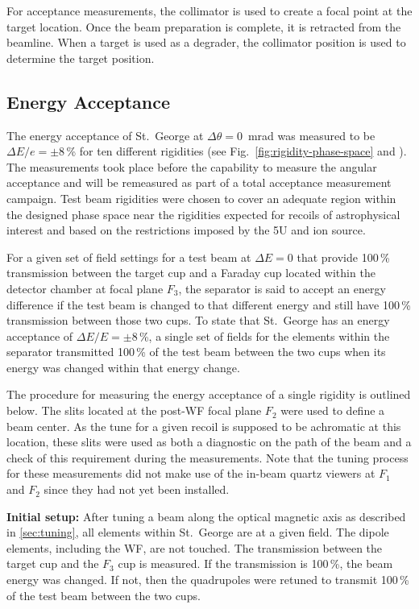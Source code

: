 For acceptance measurements, the collimator is used to create a focal point at
the target location. Once the beam preparation is complete, it is retracted
from the beamline. When a target is used as a degrader, the collimator position
is used to determine the target position.


\subsection{Energy Acceptance}

The energy acceptance of St.\ George at $\Delta\theta = 0$~mrad was measured to
be $\Delta E/e = \pm 8$\,\% for ten different rigidities (see
Fig.~\ref{fig:rigidity-phase-space} and \cite{Meisel2017}). The measurements
took place before the capability to measure the angular acceptance and will
be remeasured as part of a total acceptance measurement campaign. Test beam
rigidities were chosen to cover an adequate region within the designed phase
space near the rigidities expected for recoils of astrophysical interest and
based on the restrictions imposed by the 5U and ion source.

For a given set of field settings for a test beam at $\Delta E = 0$ that
provide 100\,\% transmission between the target cup and a Faraday cup located
within the detector chamber at focal plane $F_3$, the separator is said to
accept an energy difference if the test beam is changed to that different
energy and still have 100\,\% transmission between those two cups. To state that
St.\ George has an energy acceptance of $\Delta E/E = \pm 8$\,\%, a single set of
fields for the elements within the separator transmitted 100\,\% of the test beam
between the two cups when its energy was changed within that energy change.

The procedure for measuring the energy acceptance of a single rigidity is
outlined below. The slits located at the post-WF focal plane $F_2$
were used to define a beam center. As the tune for a given recoil is supposed
to be achromatic at this location, these slits were used as both a diagnostic
on the path of the beam and a check of this requirement during the
measurements. Note that the tuning process for these measurements did not make
use of the in-beam quartz viewers at $F_1$ and $F_2$ since they had not yet
been installed.

\textbf{Initial setup:}
After tuning a beam along the optical magnetic axis as described in
\ref{sec:tuning}, all elements within St.\ George are at a given field. The
dipole elements, including the WF, are not touched. The transmission
between the target cup and the $F_3$ cup is measured. If the transmission is
100\,\%, the beam energy was changed. If not, then the quadrupoles were retuned
to transmit 100\,\% of the test beam between the two cups.

